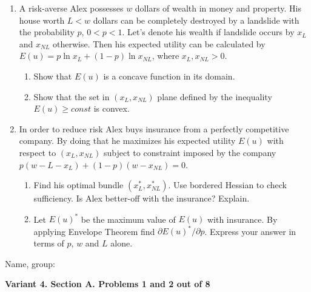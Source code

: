 \documentclass[12pt,a4paper]{article}
\begin{document}
\begin{enumerate}[resume]
\item A risk-averse Alex possesses $w$ dollars of wealth in money and property.  His house worth $L < w$ dollars can be completely destroyed by a landslide with the probability $p$, $0 < p < 1$. Let’s denote his wealth if landslide occurs by $x_L$ and $x_{NL}$ otherwise. Then his expected utility can be calculated by $E(u) = p \ln x_L + (1-p) \ln x_{NL}$, where $x_L, x_{NL} > 0$.
\begin{enumerate}
\item Show that $E(u)$ is a concave function in its domain.
\item Show that the set in  $(x_L, x_{NL})$ plane defined by the inequality $E(u)\geq const$  is convex.
\end{enumerate}

\item In order to reduce risk Alex buys insurance from a perfectly competitive company. By doing that he maximizes his expected utility $E(u)$ with respect to $(x_L, x_{NL})$ subject to constraint imposed by the company $p(w-L-x_L)+(1-p)(w-x_{NL})=0$.
\begin{enumerate}
\item  Find his optimal bundle  $(x_L^*, x_{NL}^*)$. Use bordered Hessian to check sufficiency. Is Alex better-off with the insurance? Explain.
\item Let $E(u)^*$ be the maximum value of $E(u)$ with insurance. By applying Envelope Theorem find $\partial E(u)^* / \partial p$. Express your answer in terms of $p$, $w$ and $L$ alone.
\end{enumerate}


\end{enumerate}

\begin{framed}
\begin{minipage}{42em}
Name, group:\vspace*{3ex}\par 
\noindent\dotfill
\end{minipage}
\end{framed}



\newpage

\textbf{Variant 4. Section A. Problems 1 and 2 out of 8}
\end{document}
